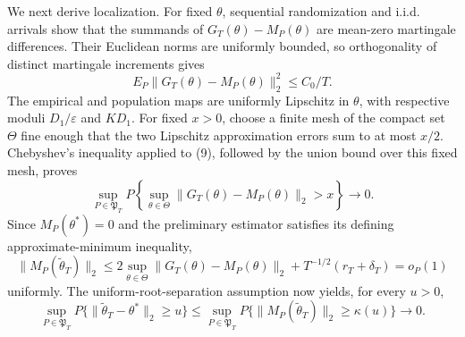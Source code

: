 We next derive localization. For fixed \(\theta\), sequential randomization and i.i.d. arrivals show that the summands of \(G_T(\theta)-M_P(\theta)\) are mean-zero martingale differences. Their Euclidean norms are uniformly bounded, so orthogonality of distinct martingale increments gives
\[
 E_P\|G_T(\theta)-M_P(\theta)\|_2^2\le C_0/T. \tag{9}
\]
The empirical and population maps are uniformly Lipschitz in \(\theta\), with respective moduli \(D_1/\varepsilon\) and \(KD_1\). For fixed \(x>0\), choose a finite mesh of the compact set \(\Theta\) fine enough that the two Lipschitz approximation errors sum to at most \(x/2\). Chebyshev's inequality applied to (9), followed by the union bound over this fixed mesh, proves
\[
 \sup_{P\in\mathfrak P_T}P\left\{\sup_{\theta\in\Theta}
 \|G_T(\theta)-M_P(\theta)\|_2>x\right\}\longrightarrow0. \tag{10}
\]
Since \(M_P(\theta^*)=0\) and the preliminary estimator satisfies its defining approximate-minimum inequality,
\[
 \|M_P(\widetilde\theta_T)\|_2
 \le2\sup_{\theta\in\Theta}\|G_T(\theta)-M_P(\theta)\|_2
 +T^{-1/2}(r_T+\delta_T)=o_P(1) \tag{11}
\]
uniformly. The uniform-root-separation assumption now yields, for every \(u>0\),
\[
 \sup_{P\in\mathfrak P_T}P\{\|\widetilde\theta_T-\theta^*\|_2\ge u\}
 \le\sup_{P\in\mathfrak P_T}P\{\|M_P(\widetilde\theta_T)\|_2\ge\kappa(u)\}
 \longrightarrow0. \tag{12}
\]

